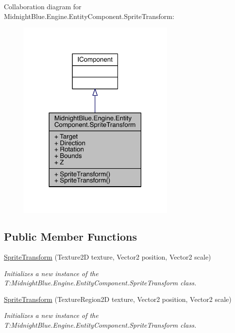 Collaboration diagram for Midnight\+Blue.\+Engine.\+Entity\+Component.\+Sprite\+Transform\+:
\nopagebreak
\begin{figure}[H]
\begin{center}
\leavevmode
\includegraphics[width=222pt]{class_midnight_blue_1_1_engine_1_1_entity_component_1_1_sprite_transform__coll__graph}
\end{center}
\end{figure}
\subsection*{Public Member Functions}
\begin{DoxyCompactItemize}
\item 
\hyperlink{class_midnight_blue_1_1_engine_1_1_entity_component_1_1_sprite_transform_a77f663b8009f613b97a0b0e4ab4afa94}{Sprite\+Transform} (Texture2D texture, Vector2 position, Vector2 scale)
\begin{DoxyCompactList}\small\item\em Initializes a new instance of the T\+:\+Midnight\+Blue.\+Engine.\+Entity\+Component.\+Sprite\+Transform class. \end{DoxyCompactList}\item 
\hyperlink{class_midnight_blue_1_1_engine_1_1_entity_component_1_1_sprite_transform_a94655f5b2b1a940eba70874f9e93d7b3}{Sprite\+Transform} (Texture\+Region2D texture, Vector2 position, Vector2 scale)
\begin{DoxyCompactList}\small\item\em Initializes a new instance of the T\+:\+Midnight\+Blue.\+Engine.\+Entity\+Component.\+Sprite\+Transform class. \end{DoxyCompactList}\end{DoxyCompactItemize}
